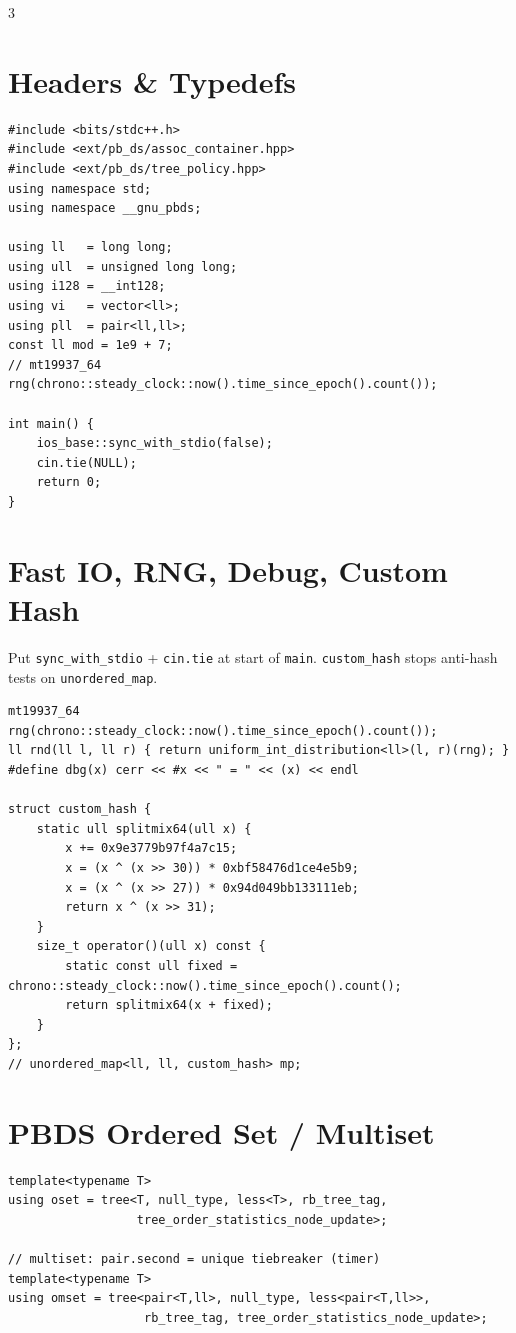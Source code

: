 \documentclass[10pt]{article}
\newcommand{\csection}[1]{\section{\textcolor{addc}{#1}}}
\newcommand{\cnote}[1]{{\scriptsize\color{addc} #1}\par}
\begin{document}
\begin{multicols*}{3}

\section{Headers \& Typedefs}
\begin{lstlisting}
#include <bits/stdc++.h>
#include <ext/pb_ds/assoc_container.hpp>
#include <ext/pb_ds/tree_policy.hpp>
using namespace std;
using namespace __gnu_pbds;

using ll   = long long;
using ull  = unsigned long long;
using i128 = __int128;
using vi   = vector<ll>;
using pll  = pair<ll,ll>;
const ll mod = 1e9 + 7;
// mt19937_64 rng(chrono::steady_clock::now().time_since_epoch().count());

int main() {
    ios_base::sync_with_stdio(false);
    cin.tie(NULL);
    return 0;
}
\end{lstlisting}

\csection{Fast IO, RNG, Debug, Custom Hash}
\cnote{Put \texttt{sync\_with\_stdio} + \texttt{cin.tie} at start of \texttt{main}. \texttt{custom\_hash} stops anti-hash tests on \texttt{unordered\_map}.}
\begin{lstlisting}[style=cppnew]
mt19937_64 rng(chrono::steady_clock::now().time_since_epoch().count());
ll rnd(ll l, ll r) { return uniform_int_distribution<ll>(l, r)(rng); }
#define dbg(x) cerr << #x << " = " << (x) << endl

struct custom_hash {
    static ull splitmix64(ull x) {
        x += 0x9e3779b97f4a7c15;
        x = (x ^ (x >> 30)) * 0xbf58476d1ce4e5b9;
        x = (x ^ (x >> 27)) * 0x94d049bb133111eb;
        return x ^ (x >> 31);
    }
    size_t operator()(ull x) const {
        static const ull fixed = chrono::steady_clock::now().time_since_epoch().count();
        return splitmix64(x + fixed);
    }
};
// unordered_map<ll, ll, custom_hash> mp;
\end{lstlisting}

\section{PBDS Ordered Set / Multiset}
\begin{lstlisting}
template<typename T>
using oset = tree<T, null_type, less<T>, rb_tree_tag,
                  tree_order_statistics_node_update>;

// multiset: pair.second = unique tiebreaker (timer)
template<typename T>
using omset = tree<pair<T,ll>, null_type, less<pair<T,ll>>,
                   rb_tree_tag, tree_order_statistics_node_update>;


\end{lstlisting}
\end{multicols*}
\end{document}
